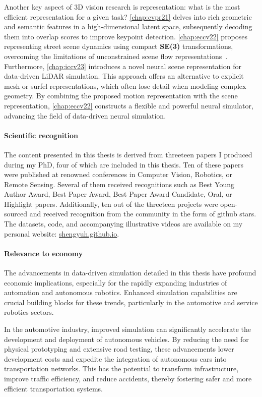 Another key aspect of 3D vision research is representation: what is the most efficient representation for a given task? \cref{chap:cvpr21} delves into rich geometric and semantic features in a high-dimensional latent space, subsequently decoding them into overlap scores to improve keypoint detection. \cref{chap:eccv22} proposes representing street scene dynamics using compact \textbf{SE(3)} transformations, overcoming the limitations of unconstrained scene flow representations~\cite{wu2019pointpwc}. Furthermore, \cref{chap:iccv23} introduces a novel neural scene representation for data-driven LiDAR simulation. This approach offers an alternative to explicit mesh or surfel representations, which often lose detail when modeling complex geometry. By combining the proposed motion representation with the scene representation, \cref{chap:eccv22} constructs a flexible and powerful neural simulator, advancing the field of data-driven neural simulation.


\paragraph{Scientific recognition}
The content presented in this thesis is derived from threeteen papers I produced during my PhD, four of which are included in this thesis. Ten of these papers were published at renowned conferences in Computer Vision, Robotics, or Remote Sensing. Several of them received recognitions such as Best Young Author Award, Best Paper Award, Best Paper Award Candidate, Oral, or Highlight papers. Additionally, ten out of the threeteen projects were open-sourced and received recognition from the community in the form of github stars. The datasets, code, and accompanying illustrative videos are available on my personal website: \url{shengyuh.github.io}.

\paragraph{Relevance to economy}
The advancements in data-driven simulation detailed in this thesis have profound economic implications, especially for the rapidly expanding industries of automation and autonomous robotics. Enhanced simulation capabilities are crucial building blocks for these trends, particularly in the automotive and service robotics sectors.

In the automotive industry, improved simulation can significantly accelerate the development and deployment of autonomous vehicles. By reducing the need for physical prototyping and extensive road testing, these advancements lower development costs and expedite the integration of autonomous cars into transportation networks. This has the potential to transform infrastructure, improve traffic efficiency, and reduce accidents, thereby fostering safer and more efficient transportation systems.

